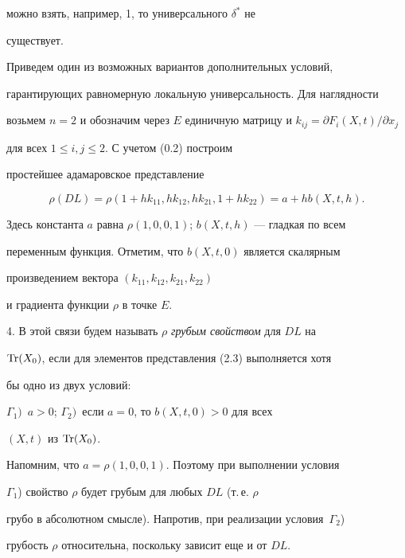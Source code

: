 можно взять, например, 1, то универсального $\delta^*$ не 


существует. 


 


Приведем один из возможных вариантов дополнительных условий, 


гарантирующих равномерную локальную универсальность. Для наглядности 


возьмем $n=2$ и обозначим через $E$ единичную матрицу и $k_{i 


j}=\partial F_i(X,t)/\partial x_j$ 


для всех $1\le i,j\le2$. С учетом (0.2) построим 


простейшее адамаровское представление 


\begin{equation} 


\rho(D L)=\rho(1+h k_{11},h k_{12},h k_{21},1+h k_{22})= 


a+h b(X,t,h). 


\end{equation} 


Здесь константа $a$ равна $\rho(1,0,0,1)$; $b(X,t,h)$ --- гладкая по всем 


переменным функция. Отметим, что $b(X,t,0)$ является скалярным 


произведением вектора $(k_{11},k_{12},k_{21},k_{22})$ 


и градиента функции $\rho$ в точке $E$. 


 


4. В этой связи будем называть $\rho$ {\it грубым свойством} для $D L$ на 


$\operatorname{Tr}(X_0)$, если для элементов представления (2.3) выполняется хотя 


бы одно из двух условий: 


$\Gamma_1)$~$a>0$; $\Gamma_2)$~если $a=0$, то $b(X,t,0)>0$ для всех 


$(X,t)$ из $\operatorname{Tr}(X_0)$. 


 


Напомним, что $a=\rho(1,0,0,1)$. Поэтому при выполнении условия 


$\Gamma_1$) свойство $\rho$ будет грубым для любых $D L$ (т.\,е. $\rho$ 


грубо в абсолютном смысле). Напротив, при реализации условия~$\Gamma_2$) 


грубость $\rho$ относительна, поскольку зависит еще и от $D L$. 


